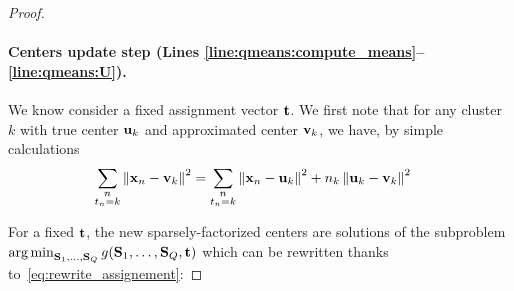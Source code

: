 \begin{proof}
\paragraph{Centers update step (Lines \ref{line:qmeans:compute_means}--\ref{line:qmeans:U}).} We know consider a fixed assignment vector ${\mathbf{t}}$. We first note that for any cluster $k$ with true center ${\mathbf{u}}_k$ and approximated center ${\mathbf{v}}_k$, we have, by simple calculations
\begin{align}
    \label{eq:rewrite_assignement}
	\sum_{\substack{n\\t_n = k}} \left \| {\mathbf{x}}_n -{\mathbf{v}}_k\right \|^2
	&= \sum_{\substack{n\\t_n = k}} \left \| {\mathbf{x}}_n-{\mathbf{u}}_k\right \|^2 + n_k \left \| {\mathbf{u}}_k-{\mathbf{v}}_k\right \|^2
\end{align}



For a fixed ${\mathbf{t}}$, the new sparsely-factorized centers are solutions of the subproblem $\operatorname*{arg\,min}_{{\mathbf{S}}_1, \ldots,{\mathbf{S}}_Q} g({\mathbf{S}}_1, \ldots,{\mathbf{S}}_Q, {\mathbf{t}})$ which can be rewritten thanks to~\eqref{eq:rewrite_assignement}:
%




\end{proof}
